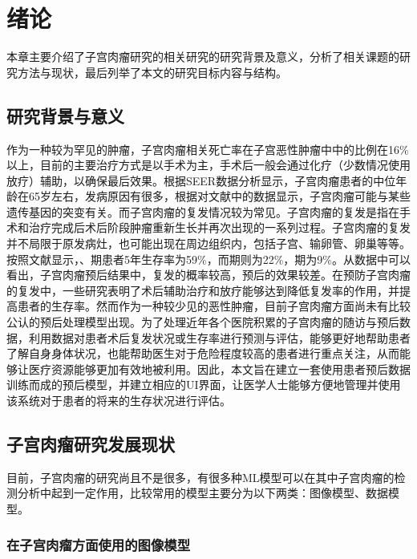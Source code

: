 \chapter{绪论}
\label{cha:intro}

本章主要介绍了子宫肉瘤研究的相关研究的研究背景及意义，分析了相关课题的研究方法与现状，最后列举了本文的研究目标内容与结构。

\section{研究背景与意义}

作为一种较为罕见的肿瘤，子宫肉瘤相关死亡率在子宫恶性肿瘤中中的比例在16\%以上\cite{commonView}，目前的主要治疗方式是以手术为主，手术后一般会通过化疗（少数情况使用放疗）辅助，以确保最后效果。根据SEER数据分析显示，子宫肉瘤患者的中位年龄在65岁左右，发病原因有很多，根据对文献中的数据显示，子宫肉瘤可能与某些遗传基因的突变有关。而子宫肉瘤的复发情况较为常见。子宫肉瘤的复发是指在手术和治疗完成后术后阶段肿瘤重新生长并再次出现的一系列过程。子宫肉瘤的复发并不局限于原发病灶，也可能出现在周边组织内，包括子宫、输卵管、卵巢等等。按照文献显示，\uppercase\expandafter{}、\uppercase\expandafter{}期患者5年生存率为59\%，而\uppercase\expandafter{}期则为22\%，\uppercase\expandafter{}期为9\%。\cite{commonView}从数据中可以看出，子宫肉瘤预后结果中，复发的概率较高，预后的效果较差。在预防子宫肉瘤的复发中，一些研究表明了术后辅助治疗和放疗能够达到降低复发率的作用，并提高患者的生存率。然而作为一种较少见的恶性肿瘤，目前子宫肉瘤方面尚未有比较公认的预后处理模型出现。为了处理近年各个医院积累的子宫肉瘤的随访与预后数据，利用数据对患者术后复发状况或生存率进行预测与评估，能够更好地帮助患者了解自身身体状况，也能帮助医生对于危险程度较高的患者进行重点关注，从而能够让医疗资源能够更加有效地被利用。因此，本文旨在建立一套使用患者预后数据训练而成的预后模型，并建立相应的UI界面，让医学人士能够方便地管理并使用该系统对于患者的将来的生存状况进行评估。

\section{子宫肉瘤研究发展现状}

目前，子宫肉瘤的研究尚且不是很多，有很多种ML模型可以在其中子宫肉瘤的检测分析中起到一定作用，比较常用的模型主要分为以下两类：图像模型、数据模型。

\subsection{在子宫肉瘤方面使用的图像模型}

